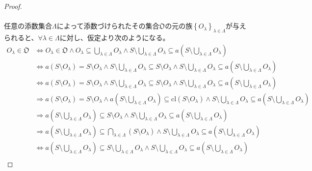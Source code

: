 \documentclass[dvipdfmx]{jsarticle}
\begin{document}
\begin{proof}
\begin{align*}
\end{align*}\par
任意の添数集合$\varLambda$によって添数づけられたその集合$\mathfrak{O}$の元の族$\left\{ O_{\lambda} \right\}_{\lambda \in \varLambda}$が与えられると、$\forall\lambda \in \varLambda$に対し、仮定より次のようになる。
\begin{align*}
O_{\lambda}\in \mathfrak{O} &\Leftrightarrow O_{\lambda}\in \mathfrak{O \land}O_{\lambda} \subseteq \bigcup_{\lambda \in \varLambda} O_{\lambda} \land S \setminus \bigcup_{\lambda \in \varLambda} O_{\lambda} \subseteq a\left( S \setminus \bigcup_{\lambda \in \varLambda} O_{\lambda} \right)\\
&\Leftrightarrow a\left( S \setminus O_{\lambda} \right) = S \setminus O_{\lambda} \land S \setminus \bigcup_{\lambda \in \varLambda} O_{\lambda} \subseteq S \setminus O_{\lambda} \land S \setminus \bigcup_{\lambda \in \varLambda} O_{\lambda} \subseteq a\left( S \setminus \bigcup_{\lambda \in \varLambda} O_{\lambda} \right)\\
&\Leftrightarrow a\left( S \setminus O_{\lambda} \right) = S \setminus O_{\lambda} \land S \setminus \bigcup_{\lambda \in \varLambda} O_{\lambda} \subseteq S \setminus O_{\lambda} \land S \setminus \bigcup_{\lambda \in \varLambda} O_{\lambda} \subseteq a\left( S \setminus \bigcup_{\lambda \in \varLambda} O_{\lambda} \right)\\
&\Rightarrow a\left( S \setminus O_{\lambda} \right) = S \setminus O_{\lambda} \land a\left( S \setminus \bigcup_{\lambda \in \varLambda} O_{\lambda} \right) \subseteq {\mathrm{cl}}\left( S \setminus O_{\lambda} \right) \land S \setminus \bigcup_{\lambda \in \varLambda} O_{\lambda} \subseteq a\left( S \setminus \bigcup_{\lambda \in \varLambda} O_{\lambda} \right)\\
&\Rightarrow a\left( S \setminus \bigcup_{\lambda \in \varLambda} O_{\lambda} \right) \subseteq S \setminus O_{\lambda} \land S \setminus \bigcup_{\lambda \in \varLambda} O_{\lambda} \subseteq a\left( S \setminus \bigcup_{\lambda \in \varLambda} O_{\lambda} \right)\\
&\Rightarrow a\left( S \setminus \bigcup_{\lambda \in \varLambda} O_{\lambda} \right) \subseteq \bigcap_{\lambda \in \varLambda} \left( S \setminus O_{\lambda} \right) \land S \setminus \bigcup_{\lambda \in \varLambda} O_{\lambda} \subseteq a\left( S \setminus \bigcup_{\lambda \in \varLambda} O_{\lambda} \right)\\
&\Leftrightarrow a\left( S \setminus \bigcup_{\lambda \in \varLambda} O_{\lambda} \right) \subseteq S \setminus \bigcup_{\lambda \in \varLambda} O_{\lambda} \land S \setminus \bigcup_{\lambda \in \varLambda} O_{\lambda} \subseteq a\left( S \setminus \bigcup_{\lambda \in \varLambda} O_{\lambda} \right)\\

\end{align*}
\end{proof}
\end{document}
